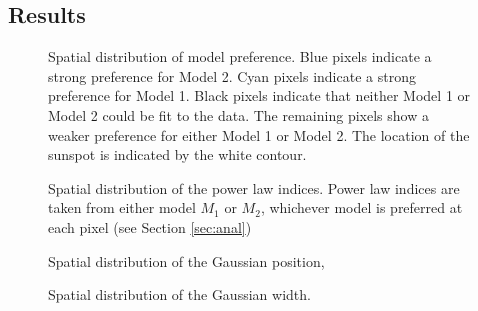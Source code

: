 \documentclass[onecolumn]{emulateapj}
\begin{document}
\subsection{Results}\label{ssec:results}


\begin{figure}
\label{fig:spatialdistribution:preference}
\centerline{
}
\centerline{
}
\centerline{
}
\caption{Spatial distribution of model preference. Blue pixels indicate a strong preference for Model 2.  Cyan pixels indicate a strong preference for Model 1.  Black pixels indicate that neither Model 1 or Model 2 could be fit to the data. The remaining pixels show a weaker preference for either Model 1 or Model 2.  The location of the sunspot is indicated by the white contour.}
\end{figure}



\begin{figure}
\label{fig:spatialdistribution:powerlawindex}
\centerline{
}
\centerline{
}
\centerline{
}
\caption{Spatial distribution of the power law indices.  Power law
  indices are taken from either model $M_{1}$ or $M_{2}$, whichever
  model is preferred at each pixel (see Section \ref{sec:anal})}
\end{figure}

\begin{figure}
\label{fig:spatialdistribution:gaussianposition}

\caption{Spatial distribution of the Gaussian position,}
\end{figure}


\begin{figure}
\label{fig:spatialdistribution:gaussianwidth}

\caption{Spatial distribution of the Gaussian width.}
\end{figure}
\end{document}
